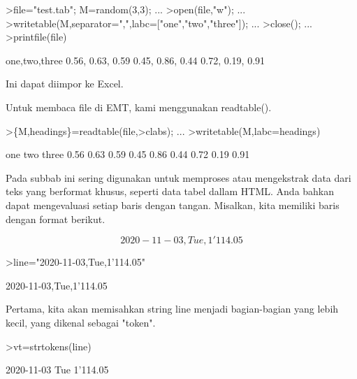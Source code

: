 \documentclass{article}
\begin{document}
\begin{eulernotebook}
\begin{eulercomment}
\begin{eulercomment}
\begin{eulercomment}
\begin{eulercomment}
\begin{eulercomment}
\begin{eulercomment}
\begin{eulercomment}
\begin{eulercomment}
\begin{eulercomment}
\begin{eulercomment}
\begin{eulercomment}
\begin{eulercomment}
\begin{eulercomment}
\begin{eulercomment}
\begin{eulerprompt}
>file="test.tab"; M=random(3,3);  ...
>open(file,"w");  ...
>writetable(M,separator=",",labc=["one","two","three"]);  ...
>close(); ...
>printfile(file)
\end{eulerprompt}
\begin{euleroutput}
  one,two,three
        0.56,      0.63,      0.59
        0.45,      0.86,      0.44
        0.72,      0.19,      0.91
\end{euleroutput}
\begin{eulercomment}
Ini dapat diimpor ke Excel.

Untuk membaca file di EMT, kami menggunakan readtable().
\end{eulercomment}
\begin{eulerprompt}
>\{M,headings\}=readtable(file,>clabs); ...
>writetable(M,labc=headings)
\end{eulerprompt}
\begin{euleroutput}
         one       two     three
        0.56      0.63      0.59
        0.45      0.86      0.44
        0.72      0.19      0.91
\end{euleroutput}
\begin{eulercomment}
Pada subbab ini sering digunakan untuk memproses atau mengekstrak data
dari teks yang berformat khusus, seperti data tabel dallam HTML. Anda
bahkan dapat mengevaluasi setiap baris dengan tangan. Misalkan, kita
memiliki baris dengan format berikut.\\
\end{eulercomment}
\begin{eulerformula}
\[
2020-11-03, Tue, 1'114.05
\]
\end{eulerformula}
\begin{eulerprompt}
>line="2020-11-03,Tue,1'114.05"
\end{eulerprompt}
\begin{euleroutput}
  2020-11-03,Tue,1'114.05
\end{euleroutput}
\begin{eulercomment}
Pertama, kita akan memisahkan string line menjadi bagian-bagian yang
lebih kecil, yang dikenal sebagai "token".
\end{eulercomment}
\begin{eulerprompt}
>vt=strtokens(line)
\end{eulerprompt}
\begin{euleroutput}
  2020-11-03
  Tue
  1'114.05
\end{euleroutput}

\end{eulercomment}
\end{eulercomment}
\end{eulercomment}
\end{eulercomment}
\end{eulercomment}
\end{eulercomment}
\end{eulercomment}
\end{eulercomment}
\end{eulercomment}
\end{eulercomment}
\end{eulercomment}
\end{eulercomment}
\end{eulercomment}
\end{eulercomment}
\end{eulernotebook}
\end{document}
